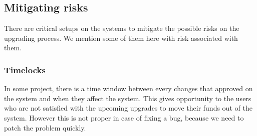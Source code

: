 




\subsection{Mitigating risks}
There are critical setups on the systems to mitigate the possible risks on the upgrading process. We mention some of them here with risk associated with them.

\subsubsection{Timelocks}
In some project, there is a time window between every changes that approved on the system and when they affect the system. This gives opportunity to the users who are not satisfied with the upcoming upgrades to move their funds out of the system. However this is not proper in case of fixing a bug, because we need to patch the problem quickly.

